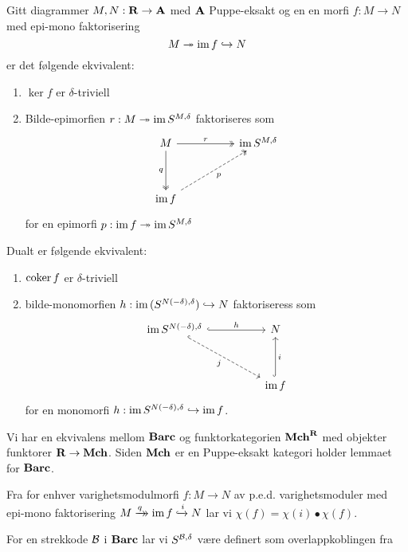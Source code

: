 \begin{lemma}\label{lem:triv_puppe-eksakt}
  Gitt diagrammer $M,N:\textnormal{\textbf{{R}}}\to\textnormal{\textbf{{A}}}$ med $\textnormal{\textbf{{A}}}$
  Puppe-eksakt og en en morfi $f: M\to N$ med epi-mono
  faktorisering
  \[M\twoheadrightarrow\textnormal{im}\, f\hookrightarrow N\]
  er det følgende ekvivalent:
  \begin{enumerate}
    \item $\ker f$ er $\delta$-triviell
    \item Bilde-epimorfien $r: M\twoheadrightarrow\textnormal{im}\, S^{M,\delta}$
      faktoriseres som
      \[\begin{tikzcd}
	M && {\im S^{M,\delta}} \\
	\\
	{\im f}
	\arrow["r", two heads, from=1-1, to=1-3]
	\arrow["q"', two heads, from=1-1, to=3-1]
	\arrow["p"', dashed, two heads, from=3-1, to=1-3]
\end{tikzcd}\]
      for en epimorfi $p: \textnormal{im}\, f\twoheadrightarrow\textnormal{im}\, S^{M,\delta}$
  \end{enumerate}
  Dualt er følgende ekvivalent:
  \begin{enumerate}
    \item $\textnormal{coker}\, f$ er $\delta$-triviell
    \item bilde-monomorfien
      $h:\textnormal{im}\,(S^{N(-\delta),\delta})\hookrightarrow N$
      faktoriseress som 
      \[\begin{tikzcd}
	{\im S^{N(-\delta),\delta}} && N \\
	\\
	&& {\im f}
	\arrow["h", hook, from=1-1, to=1-3]
	\arrow["j"', dashed, hook, from=1-1, to=3-3]
	\arrow["i"', hook, from=3-3, to=1-3]
\end{tikzcd}\]
  for en monomorfi $h:\textnormal{im}\, S^{N(-\delta),\delta}\hookrightarrow\textnormal{im}\,
      f$.
  \end{enumerate}
\end{lemma}


Vi har en ekvivalens mellom $\textnormal{\textbf{Barc}}$ og funktorkategorien
$\textnormal{\textbf{Mch}}^{\textnormal{\textbf{{R}}}}$ med objekter funktorer $\textnormal{\textbf{{R}}}\to\textnormal{\textbf{Mch}}$. Siden
$\textnormal{\textbf{Mch}}$ er en Puppe-eksakt kategori holder lemmaet for
$\textnormal{\textbf{Barc}}$.

Fra \citep[teorem 1.1]{Bauer2020} for enhver
varighetsmodulmorfi $f: M\to N$ av p.e.d. varighetsmoduler
med epi-mono faktorisering $M\xrightarrow[]{q}\mathrel{\mkern-14mu}\rightarrow\textnormal{im}\, f\xhookrightarrow{i}
N$ lar vi $\chi(f) = \chi(i)\bullet\chi(f)$.

For en strekkode $\mathcal{B}$ i $\textnormal{\textbf{Barc}}$ lar vi
$S^{\mathcal{B},\delta}$ være definert som overlappkoblingen fra

